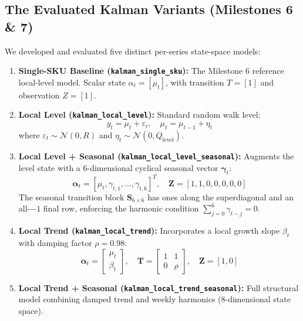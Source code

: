\documentclass[conference]{IEEEtran}
\begin{document}
\subsection{The Evaluated Kalman Variants (Milestones 6 \& 7)}
We developed and evaluated five distinct per-series state-space models:
\begin{enumerate}
    \item \textbf{Single-SKU Baseline (\texttt{kalman\_single\_sku}):} The Milestone 6 reference local-level model. Scalar state $\alpha_t = [\mu_t]$, with transition $T = [1]$ and observation $Z = [1]$.
    \item \textbf{Local Level (\texttt{kalman\_local\_level}):} Standard random walk level:
    \begin{equation}
    y_t = \mu_t + \varepsilon_t, \quad \mu_t = \mu_{t-1} + \eta_t
    \end{equation}
    where $\varepsilon_t \sim \mathcal{N}(0, R)$ and $\eta_t \sim \mathcal{N}(0, Q_{\text{level}})$.
    \item \textbf{Local Level + Seasonal (\texttt{kalman\_local\_level\_seasonal}):} Augments the level state with a 6-dimensional cyclical seasonal vector $\boldsymbol{\gamma}_t$:
    \begin{equation}
    \boldsymbol{\alpha}_t = [\mu_t, \gamma_{t,1}, \dots, \gamma_{t,6}]^T, \quad \mathbf{Z} = [1, 1, 0, 0, 0, 0, 0]
    \end{equation}
    The seasonal transition block $\mathbf{S}_{6 \times 6}$ has ones along the superdiagonal and an all-$-1$ final row, enforcing the harmonic condition $\sum_{j=0}^6 \gamma_{t-j} = 0$.
    \item \textbf{Local Trend (\texttt{kalman\_local\_trend}):} Incorporates a local growth slope $\beta_t$ with damping factor $\rho = 0.98$:
    \begin{equation}
    \boldsymbol{\alpha}_t = \begin{bmatrix} \mu_t \\ \beta_t \end{bmatrix}, \quad \mathbf{T} = \begin{bmatrix} 1 & 1 \\ 0 & \rho \end{bmatrix}, \quad \mathbf{Z} = [1, 0]
    \end{equation}
    \item \textbf{Local Trend + Seasonal (\texttt{kalman\_local\_trend\_seasonal}):} Full structural model combining damped trend and weekly harmonics ($8$-dimensional state space).
\end{enumerate}
\end{document}
